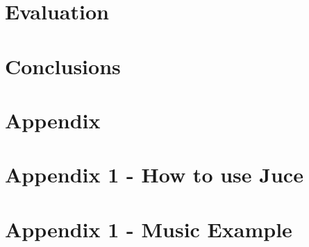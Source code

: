 \documentclass[12pt]{article}
\begin{document}
	
	

	

	
	\section{Evaluation}
	
	\section{Conclusions}
	
	\section{Appendix}
	\section{Appendix 1 - How to use Juce}
	\section{Appendix 1 - Music Example}
	
\end{document}
